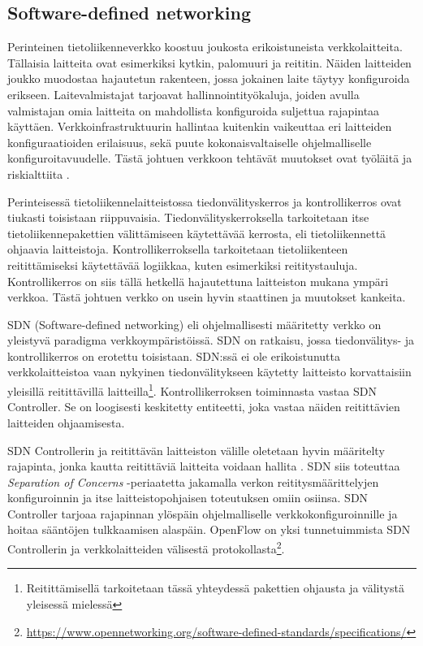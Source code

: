 \subsection{Software-defined networking}
Perinteinen tietoliikenneverkko koostuu joukosta erikoistuneista verkkolaitteita. 
Tällaisia laitteita ovat esimerkiksi kytkin, palomuuri ja reititin. Näiden laitteiden joukko muodostaa hajautetun rakenteen, jossa jokainen laite täytyy konfiguroida erikseen.
Laitevalmistajat tarjoavat hallinnointityökaluja, joiden avulla valmistajan omia laitteita on mahdollista konfiguroida suljettua rajapintaa käyttäen. Verkkoinfrastruktuurin hallintaa kuitenkin vaikeuttaa eri laitteiden konfiguraatioiden erilaisuus, sekä puute kokonaisvaltaiselle ohjelmalliselle konfiguroitavuudelle.
Tästä johtuen verkkoon tehtävät muutokset ovat työläitä ja riskialttiita \cite{kreutz2015software}.

Perinteisessä tietoliikennelaitteistossa tiedonvälityskerros ja kontrollikerros ovat tiukasti toisistaan riippuvaisia. Tiedonvälityskerroksella tarkoitetaan itse tietoliikennepakettien välittämiseen käytettävää kerrosta, eli tietoliikennettä ohjaavia laitteistoja. Kontrollikerroksella tarkoitetaan tietoliikenteen reitittämiseksi käytettävää logiikkaa, kuten esimerkiksi reititystauluja. Kontrollikerros on siis tällä hetkellä hajautettuna laitteiston mukana ympäri verkkoa. Tästä johtuen verkko on usein hyvin staattinen ja muutokset kankeita.

SDN (Software-defined networking) eli ohjelmallisesti määritetty verkko on yleistyvä paradigma verkkoympäristöissä.  SDN on ratkaisu, jossa tiedonvälitys- ja kontrollikerros on erotettu toisistaan. SDN:ssä ei ole erikoistunutta verkkolaitteistoa vaan nykyinen tiedonvälitykseen käytetty laitteisto korvattaisiin yleisillä reitittävillä laitteilla\footnote{Reitittämisellä tarkoitetaan tässä yhteydessä pakettien ohjausta ja välitystä yleisessä mielessä}. Kontrollikerroksen toiminnasta vastaa SDN Controller. Se on loogisesti keskitetty entiteetti, joka vastaa näiden reitittävien laitteiden ohjaamisesta.

SDN Controllerin ja reitittävän laitteiston välille oletetaan hyvin määritelty rajapinta, jonka kautta reitittäviä laitteita voidaan hallita \cite{kreutz2015software}. SDN siis toteuttaa \textit{Separation of Concerns} -periaatetta jakamalla verkon reititysmäärittelyjen konfiguroinnin ja itse laitteistopohjaisen toteutuksen omiin osiinsa. SDN Controller tarjoaa rajapinnan ylöspäin ohjelmalliselle verkkokonfiguroinnille ja hoitaa sääntöjen tulkkaamisen alaspäin. OpenFlow on yksi tunnetuimmista SDN Controllerin ja verkkolaitteiden välisestä protokollasta\footnote{\url{https://www.opennetworking.org/software-defined-standards/specifications/}}.

